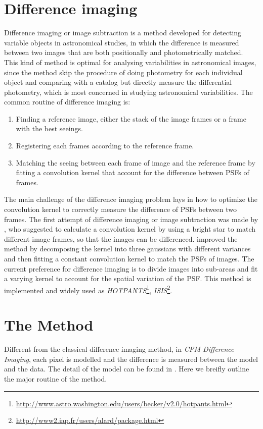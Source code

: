 \documentclass[12pt, preprint]{aastex}
\newcommand{\project}[1]{\textsl{#1}}
\newcommand{\cpmdiff}{\project{CPM Difference Imaging}}
\begin{document}
\section{Difference imaging}
Difference imaging or image subtraction is a method developed for detecting variable objects in astronomical studies, in which the difference is measured between two images that are both positionally and photometrically matched. This kind of method is optimal for analysing variabilities in astronomical images, since the method skip the procedure of doing photometry for each individual object and comparing with a catalog but directly measure the differential photometry, which is most concerned in studying astronomical variabilities.
The common routine of difference imaging is:
\begin{enumerate}
\item
Finding a reference image, either the stack of the image frames or a frame with the best seeings.
\item
Registering each frames according to the reference frame.
\item
Matching the seeing between each frame of image and the reference frame by fitting a convolution kernel that account for the difference between PSFs of frames.
\end{enumerate}
The main challenge of the difference imaging problem lays in how to optimize the convolution kernel to correctly measure the difference of PSFs between two frames.
The first attempt of difference imaging or image subtraction was made by \cite{imagesub1}, who suggested to calculate a convolution kernel by using a bright star to match different image frames, so that the images can be differenced. 
\cite{alard} improved the method by decomposing the kernel into three gaussians with different variances and then fitting a constant convolution kernel to match the PSFs of images.
The current preference for difference imaging \citep{varyingkernel} is to divide images into sub-areas and fit a varying kernel to account for the spatial variation of the PSF. This method is implemented and widely used as \project{HOTPANTS}\footnote{\url{http://www.astro.washington.edu/users/becker/v2.0/hotpants.html}}, \project{ISIS}\footnote{\url{http://www2.iap.fr/users/alard/package.html}}.

\section{The Method}
Different from the classical difference imaging method, in \cpmdiff, each pixel is modelled and the difference is measured between the model and the data. The detail of the model can be found in \cite{cpm}. Here we breifly outline the major routine of the method.
\end{document}

